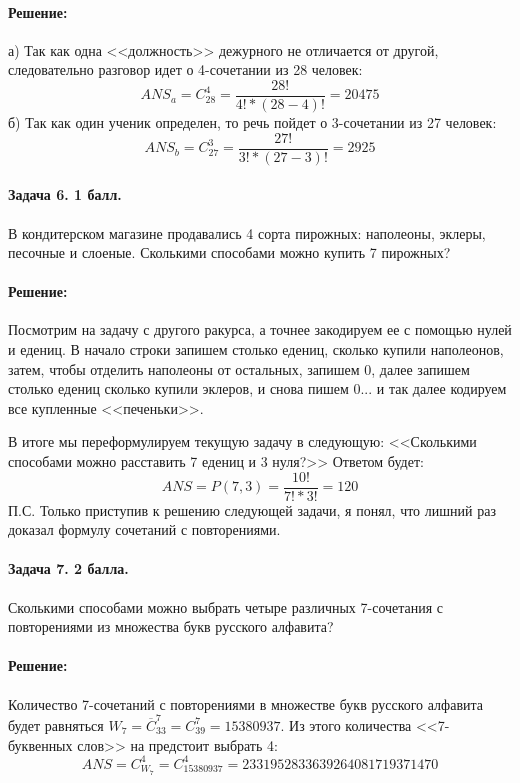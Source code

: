 \documentclass[12pt]{article}
\begin{document}
\paragraph{\bf Решение:}
а) Так как одна <<должность>> дежурного не отличается от другой, следовательно
разговор идет о 4-сочетании из 28 человек:
$$ ANS_a = C_{28}^{4} = \frac{28!}{4! * (28 - 4)!} = 20475 $$
б) Так как один ученик определен, то речь пойдет о 3-сочетании из 27 человек:
$$ ANS_b = C_{27}^{3} = \frac{27!}{3! * (27 - 3)!} = 2925 $$

\paragraph{Задача 6. 1 балл.} В кондитерском магазине продавались 4 сорта 
пирожных: наполеоны, эклеры, песочные и слоеные. Сколькими способами 
можно купить 7 пирожных? 

\paragraph{\bf Решение:}
Посмотрим на задачу с другого ракурса, а точнее закодируем ее с помощью
нулей и едениц. В начало строки запишем столько едениц, сколько купили наполеонов, затем,
чтобы отделить наполеоны от остальных, запишем 0, далее запишем столько едениц
сколько купили эклеров, и снова пишем 0... и так далее кодируем все купленные <<печеньки>>.

В итоге мы переформулируем текущую задачу в следующую: <<Сколькими способами можно
расставить 7 едениц и 3 нуля?>> Ответом будет:
$$ ANS = P(7, 3) = \frac{10!}{7! * 3!} = 120 $$
П.С. Только приступив к решению следующей задачи, я понял, что лишний раз доказал формулу
сочетаний с повторениями.

\paragraph{Задача 7. 2 балла.} Сколькими способами можно выбрать четыре 
различных 7-со\-че\-та\-ния с повторениями из множества букв русского 
алфавита?

\paragraph{\bf Решение:}
Количество 7-сочетаний с повторениями в множестве букв русского алфавита
будет равняться $ W_7 = \overline{C}_{33}^{7} = C_{39}^{7} = 15380937 $. Из этого
количества <<7-буквенных слов>> на предстоит выбрать 4:
$$ ANS = C_{W_7}^{4} = C_{15380937}^{4} = 2331952833639264081719371470 $$
\end{document}
